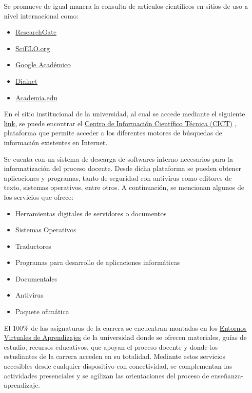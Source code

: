 Se promueve de igual manera la consulta de artículos científicos en sitios de uso a nivel internacional como:

\begin{itemize}
	\setlength\itemsep{-0.5em}
	\item \href{https://www.researchgate.net}{ResearchGate}
	\item \href{https://www.scielo.org/es}{SciELO.org}
	\item \href{https://scholar.google.com/}{Google Académico}
	\item \href{https://dialnet.unirioja.es}{Dialnet}
	\item \href{https://www.academia.edu}{Academia.edu}
\end{itemize}

En el sitio institucional de la universidad, al cual se accede mediante el siguiente \href{https://www.umcc.cu/}{link}, se puede encontrar el \href{http://cict.umcc.cu/}{Centro de Información Científico Técnica (CICT)} , plataforma que permite acceder a los diferentes motores de búsquedas de información existentes en Internet.

Se cuenta con un sistema de descarga de softwares interno necesarios para la informatización del proceso docente. Desde dicha plataforma se pueden obtener aplicaciones y programas, tanto de seguridad con antivirus como editores de texto, sistemas operativos, entre otros. A continuación, se mencionan algunos de los servicios que ofrece:

\begin{itemize}
	\setlength\itemsep{-0.5em}
	\item Herramientas digitales de servidores o documentos 
	\item Sistemas Operativos 
	\item Traductores 
	\item Programas para desarrollo de aplicaciones informáticas 
	\item Documentales
	\item Antivirus
	\item Paquete ofimática 
\end{itemize}

El 100\% de las asignaturas de la carrera se encuentran montadas en los \href{https://eva.umcc.cu/}{Entornos Virtuales de Aprendizajes} de la universidad donde se ofrecen materiales, guías de estudio, recursos educativos, que apoyan el proceso docente y donde los estudiantes de la carrera acceden en su totalidad. Mediante estos servicios accesibles desde cualquier dispositivo con conectividad, se complementan las actividades presenciales y se agilizan las orientaciones del proceso de enseñanza-aprendizaje.